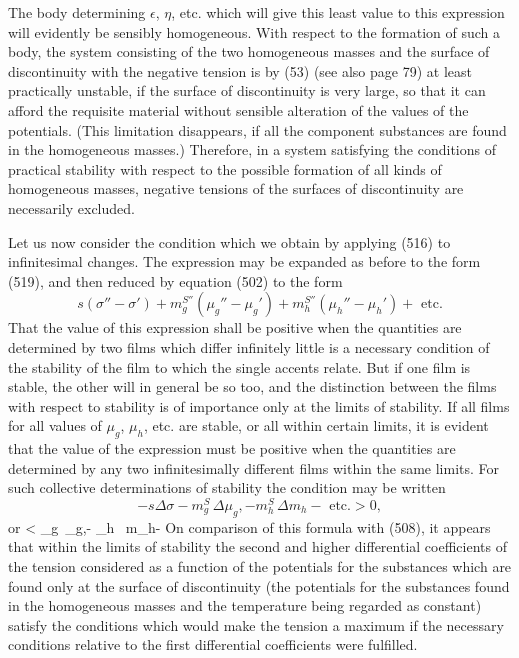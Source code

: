 \documentclass[12pt]{article}
\begin{document}
{The body determining $\epsilon$, $\eta$, etc. which will give this least value to this expression will evidently be sensibly homogeneous. With respect to the formation of such a body, the system consisting of the two homogeneous masses and the surface of discontinuity with the negative tension is by (53) (see also page 79) at least practically unstable, if the surface of discontinuity is very large, so that it can afford the requisite material without sensible alteration of the values of the potentials. (This limitation disappears, if all the component substances are found in the homogeneous masses.) Therefore, in a system satisfying the conditions of practical stability with respect to the possible formation of all kinds of homogeneous masses, negative tensions of the surfaces of discontinuity are necessarily excluded.

Let us now consider the condition which we obtain by applying (516) to infinitesimal changes. The expression may be expanded as before to the form (519), and then reduced by equation (502) to the form         
$$ s(\sigma'' -\sigma') + m_g^{S''}(\mu_g''-\mu_g') + m_h^{S''}(\mu_h'' -\mu_h')+ \text{ etc.} $$
That the value of this expression shall be positive when the quantities are determined by two films which differ infinitely little is a necessary condition of the stability of the film to which the single accents relate. But if one film is stable, the other will in general be so too, and the distinction between the films with respect to stability is of importance only at the limits of stability. If all films for all values of $\mu_g$, $\mu_h$, etc. are stable, or all within certain limits, it is evident that the value of the expression must be positive when the quantities are determined by any two infinitesimally different films within the same limits. For such collective determinations of stability the condition may be written
$$ -s\Delta \sigma- m_g^S\, \Delta\mu_g,- m_h^S \, \Delta m_h - \text{ etc.} > 0,$$
or
\eqs \Delta \sigma< \Gamma_g\, \Delta\mu_g,- \Gamma_h \, \Delta m_h-  \label{521} \eqe
On comparison of this formula with (508), it appears that within the limits of stability the second and higher differential coefficients of the tension considered as a function of the potentials for the substances which are found only at the surface of discontinuity (the potentials for the substances found in the homogeneous masses and the temperature being regarded as constant) satisfy the conditions which would make the tension a maximum if the necessary conditions relative to the first differential coefficients were fulfilled.

}
\end{document}
